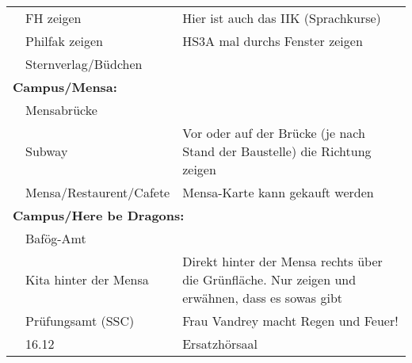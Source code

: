 \documentclass[a4paper,10pt]{article}
\newcounter{magicrownumbers}[page]
\newcommand\rownumber{\stepcounter{magicrownumbers}\arabic{magicrownumbers}}
\begin{document}
\begin{tabularx}{\textwidth}{p{}p{}p{}}
  \rownumber & FH zeigen & Hier ist auch das IIK (Sprachkurse) \\
  \rownumber & Philfak zeigen & HS3A mal durchs Fenster zeigen \\
  \rownumber & Sternverlag/Büdchen & \\
  \hline
  \multicolumn{3}{l}{\large{\textbf{Campus/Mensa:}}} \\
  \rownumber & Mensabrücke & \\
  \rownumber & Subway &  Vor oder auf der Brücke (je nach Stand der Baustelle) die Richtung zeigen\\
  \rownumber & Mensa/Restaurent/Cafete & Mensa-Karte kann gekauft werden \\
  \hline
  \multicolumn{3}{l}{\large{\textbf{Campus/Here be Dragons:}}} \\
  \rownumber & Bafög-Amt & \\
  \rownumber & Kita hinter der Mensa & Direkt hinter der Mensa rechts über die Grünfläche. Nur
  zeigen und erwähnen, dass es sowas gibt \\
  \rownumber & Prüfungsamt (SSC) & Frau Vandrey macht Regen und Feuer!\\
  \rownumber & 16.12 & Ersatzhörsaal \\
\end{tabularx}
\newpage
\end{document}
